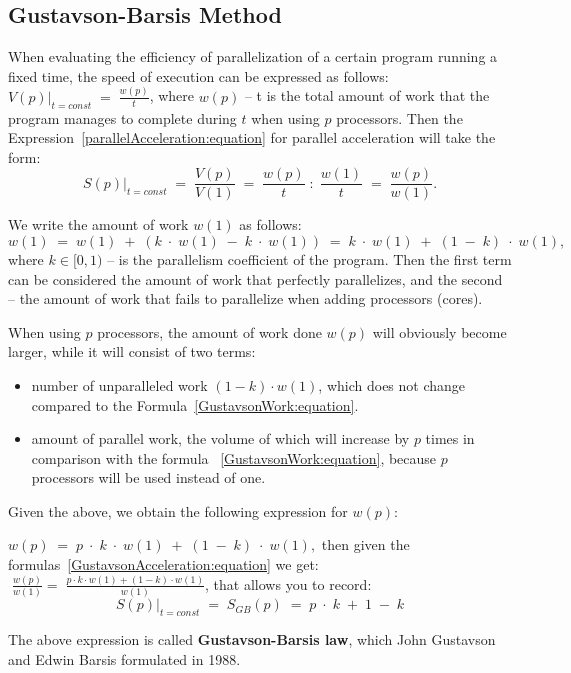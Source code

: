 { %
	\subsection{Gustavson-Barsis Method}
	\par When evaluating the efficiency of parallelization of a certain program running a fixed time, the speed of execution can be expressed as follows: $\left.V(p)\right|_{t=const}\;=\;\frac {w(p)}t$, where $w(p)$ – t is the total amount of work that the program manages to complete during $ t $ when using $p$ processors. Then the Expression~\eqref{parallelAcceleration:equation} for parallel acceleration will take the form:
	\begin{equation}
		\label{GustavsonAcceleration:equation}
		\left.S(p)\right|_{t=const}\;=\;\frac{V(p)}{V(1)}\;=\;\frac{w(p)}t\;:\;\frac{w(1)}t\;=\;\frac{w(p)}{w(1)}.
	\end{equation}
	\par We write the amount of work $w (1)$ as follows:
	\begin{equation}
		\label{GustavsonWork:equation}
		w(1)\;=\;w(1)\;+\;(k\;\cdot\;w(1)\;-\;k\;\cdot\;w(1))\;=\;k\;\cdot\;w(1)\;+\;(1\;-\;k)\;\cdot\;w(1),
	\end{equation}
	where $k\in\lbrack0,1)$ – is the parallelism coefficient of the program. Then the first term can be considered the amount of work that perfectly parallelizes, and the second – the amount of work that fails to parallelize when adding processors (cores).
	\par When using $p$ processors, the amount of work done $w(p)$ will obviously become larger, while it will consist of two terms:
	\begin{itemize}
		\item number of unparalleled work $(1-k)\cdot w(1)$, which does not change compared to the Formula~\eqref{GustavsonWork:equation}.
		\item amount of parallel work, the volume of which will increase by $p$ times in comparison with the formula ~\eqref{GustavsonWork:equation}, because $p$ processors will be used instead of one.
	\end{itemize}
	\par Given the above, we obtain the following expression for $w(p)$:
	\par$w(p)\;=\;p\;\cdot\;k\;\cdot\;w(1)\;+\;(1\;-\;k)\;\cdot\;w(1),$ then given the formulas~\eqref{GustavsonAcceleration:equation} we get: $\;\frac{w(p)}{w(1)}=\;\frac{p\cdot k\cdot w(1)+(1-k)\cdot w(1)}{w(1)}$, that allows you to record:
	\begin{equation}
		\left.S(p)\right|_{t=const}\;=\;S_{GB}(p)\;=\;p\;\cdot\;k\;+\;1\;-\;k
	\end{equation}
	\par The above expression is called \textbf {Gustavson-Barsis law}, which John Gustavson and Edwin Barsis formulated in 1988.
	\par
}